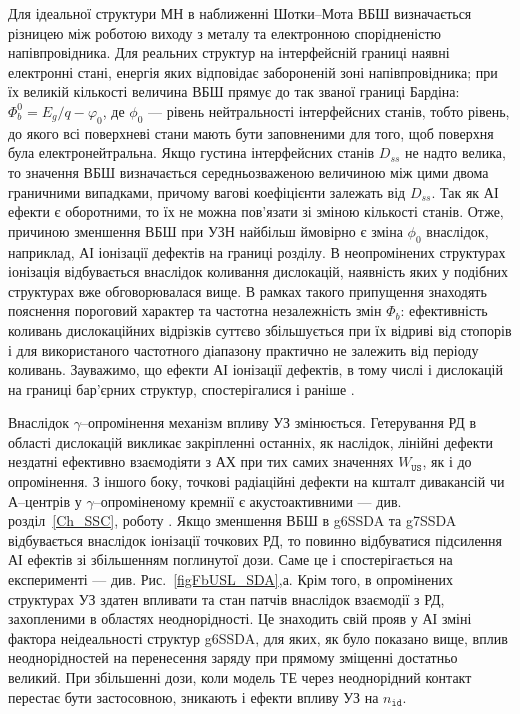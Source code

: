 Для ідеальної структури МН в наближенні Шотки--Мота ВБШ визначається різницею між роботою виходу з металу та електронною спорідненістю напівпровідника.
Для реальних структур на інтерфейсній границі наявні електронні стані, енергія яких відповідає забороненій зоні напівпровідника;
при їх великій кількості величина ВБШ прямує до так званої границі Бардіна: $\Phi_b^0=E_g/q-\varphi_0$,
де $\phi_0$ --- рівень нейтральності інтерфейсних станів, тобто рівень, до якого всі поверхневі стани мають бути заповненими для того, щоб
поверхня була електронейтральна.
Якщо густина інтерфейсних станів $D_{ss}$ не надто велика, то значення ВБШ визначається середньозваженою величиною між цими двома
граничними випадками, причому вагові коефіцієнти залежать від $D_{ss}$.
Так як АІ ефекти є оборотними, то їх не можна пов'язати зі зміною кількості станів.
Отже, причиною зменшення ВБШ при УЗН найбільш ймовірно є зміна $\phi_0$ внаслідок, наприклад, АІ іонізації дефектів на границі розділу.
В неопромінених структурах іонізація відбувається внаслідок коливання дислокацій, наявність яких у подібних структурах вже обговорювалася вище.
В рамках такого припущення знаходять пояснення пороговий характер та частотна незалежність змін $\Phi_b$:
ефективність коливань дислокаційних відрізків суттєво збільшується при їх відриві від стопорів і для використаного частотного діапазону
практично не залежить від періоду коливань.
Зауважимо, що ефекти АІ іонізації дефектів, в тому числі і дислокацій на границі бар'єрних структур, спостерігалися і раніше \cite{Olikh:FTP2011,Korotchenkov1995,OstrKorBook}.


Внаслідок $\gamma$--опромінення механізм впливу УЗ змінюється.
Гетерування РД в області дислокацій викликає закріпленні останніх, як наслідок, лінійні дефекти нездатні ефективно взаємодіяти з АХ при тих самих значеннях
$W_\mathtt{US}$, як і до опромінення.
З іншого боку, точкові радіаційні дефекти на кшталт дивакансій чи А--центрів у $\gamma$--опроміненому кремнії є акустоактивними --- див. розділ~\ref{Ch_SSC}, роботу \cite{YOlikh2006TPLr}.
Якщо зменшення ВБШ в g6SSDA та g7SSDA відбувається внаслідок іонізації точкових РД, то повинно відбуватися підсилення АІ ефектів зі збільшенням поглинутої дози.
Саме це і спостерігається на експерименті --- див. Рис.~\ref{figFbUSL_SDA},а.
Крім того, в опромінених структурах УЗ здатен впливати та стан патчів внаслідок взаємодії з РД, захопленими в областях неоднорідності.
Це знаходить свій прояв у АІ зміні фактора неідеальності структур g6SSDA, для яких, як було показано вище, вплив неоднорідностей на перенесення заряду при прямому зміщенні достатньо великий.
При збільшенні дози, коли модель ТЕ через неоднорідний контакт перестає бути застосовною, зникають і ефекти впливу УЗ на $n_\mathtt{id}$.


